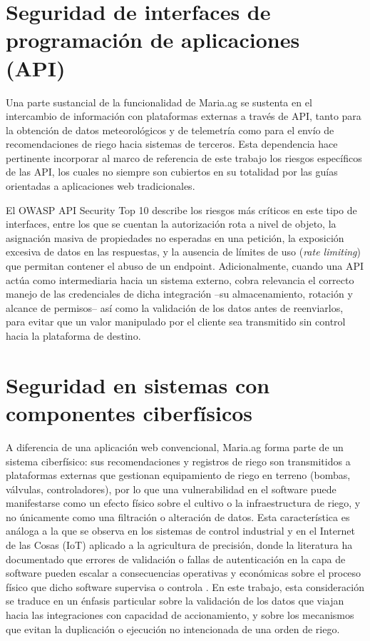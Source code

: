 \documentclass[12pt,letterpaper]{report}
\begin{document}
\section*{Seguridad de interfaces de programación de aplicaciones (API)}

Una parte sustancial de la funcionalidad de Maria.ag se sustenta en el
intercambio de información con plataformas externas a través de API, tanto
para la obtención de datos meteorológicos y de telemetría como para el envío
de recomendaciones de riego hacia sistemas de terceros. Esta dependencia hace
pertinente incorporar al marco de referencia de este trabajo los riesgos
específicos de las API, los cuales no siempre son cubiertos en su totalidad
por las guías orientadas a aplicaciones web tradicionales.

El OWASP API Security Top 10 describe los riesgos más críticos en este tipo
de interfaces, entre los que se cuentan la autorización rota a nivel de
objeto, la asignación masiva de propiedades no esperadas en una petición, la
exposición excesiva de datos en las respuestas, y la ausencia de límites de
uso (\textit{rate limiting}) que permitan contener el abuso de un endpoint.
Adicionalmente, cuando una API actúa como intermediaria hacia un sistema
externo, cobra relevancia el correcto manejo de las credenciales de dicha
integración --su almacenamiento, rotación y alcance de permisos-- así como la
validación de los datos antes de reenviarlos, para evitar que un valor
manipulado por el cliente sea transmitido sin control hacia la plataforma de
destino.

\section*{Seguridad en sistemas con componentes ciberfísicos}

A diferencia de una aplicación web convencional, Maria.ag forma parte de un
sistema ciberfísico: sus recomendaciones y registros de riego son transmitidos
a plataformas externas que gestionan equipamiento de riego en terreno
(bombas, válvulas, controladores), por lo que una vulnerabilidad en el
software puede manifestarse como un efecto físico sobre el cultivo o la
infraestructura de riego, y no únicamente como una filtración o alteración de
datos. Esta característica es análoga a la que se observa en los sistemas de
control industrial y en el Internet de las Cosas (IoT) aplicado a la
agricultura de precisión, donde la literatura ha documentado que errores de
validación o fallas de autenticación en la capa de software pueden escalar a
consecuencias operativas y económicas sobre el proceso físico que dicho
software supervisa o controla \autocite{fathy2023secure}. En este trabajo,
esta consideración se traduce en un énfasis particular sobre la validación de
los datos que viajan hacia las integraciones con capacidad de accionamiento, y
sobre los mecanismos que evitan la duplicación o ejecución no intencionada de
una orden de riego.
\end{document}
